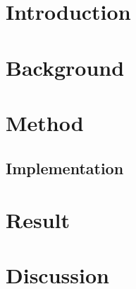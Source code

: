 \documentclass[fleqn,10pt]{SelfArx} %
\begin{document}
\flushbottom %

\maketitle %

\tableofcontents %

\thispagestyle{empty} %


\section{Introduction} %




\section{Background}


\section{Method} \label{sec:method}


\subsection{Implementation}


\section{Result} \label{sec:result}


\section{Discussion}
\end{document}
